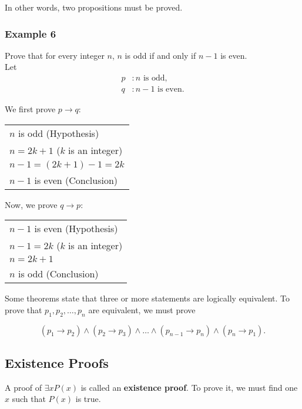In other words, two propositions must be proved.

\subsubsection*{Example 6}

Prove that for every integer $n$, $n$ is odd if and only if $n - 1$ is even.\\

Let
\begin{align*}
    p &: n \text{ is odd},\\
    q &: n - 1 \text{ is even}.
\end{align*}

\clearpage

We first prove $p \rightarrow q$:

\begin{table}[h]
\centering
\begin{tabular}{l}
$n$ is odd (Hypothesis)\\
$n = 2k + 1$ ($k$ is an integer)\\
$n - 1 = (2k + 1) - 1 = 2k$\\
$n - 1$ is even (Conclusion)
\end{tabular}
\end{table}

Now, we prove $q \rightarrow p$:

\begin{table}[h]
\centering
\begin{tabular}{l}
$n - 1$ is even (Hypothesis)\\
$n - 1 = 2k$ ($k$ is an integer)\\
$n = 2k + 1$\\
$n$ is odd (Conclusion)
\end{tabular}
\end{table}

Some theorems state that three or more statements are logically equivalent.  To prove that $p_1, p_2, \dots, p_n$ are equivalent, we must prove

\[
    (p_1 \rightarrow p_2) \land (p_2 \rightarrow p_3) \land \dots \land (p_{n-1} \rightarrow p_n) \land (p_n \rightarrow p_1).
\]

\subsection*{Existence Proofs}

A proof of $\exists x P(x)$ is called an \textbf{existence proof}.  To prove it, we must find one $x$ such that $P(x)$ is true.

